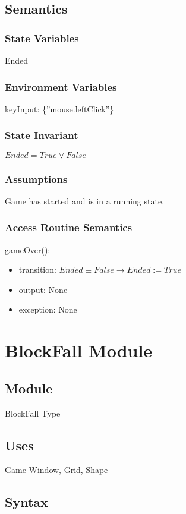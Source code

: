 \documentclass[12pt]{article}
\begin{document}
\subsection* {Semantics}

\subsubsection* {State Variables}
Ended
\subsubsection* {Environment Variables}
keyInput: \{”mouse.leftClick”\}
\subsubsection* {State Invariant}
$ Ended = True \lor False $
\subsubsection* {Assumptions}
Game has started and is in a running state.

\subsubsection* {Access Routine Semantics}

\noindent gameOver():
\begin{itemize}
\item transition: $Ended \equiv False \rightarrow Ended := True$ 
\item output: None
\item exception: None
\end{itemize}

\newpage

\section* {BlockFall Module}

\subsection*{Module}
BlockFall Type
\subsection* {Uses}

Game Window, Grid, Shape

\subsection* {Syntax}
\end{document}
